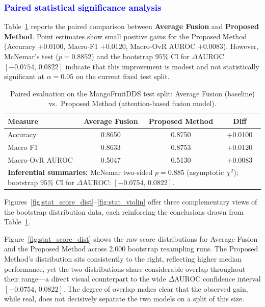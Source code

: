 \documentclass[utf8]{FrontiersinHarvard} %
\begin{document}
\subsubsection{\textcolor{blue}{Paired statistical significance analysis}}
\label{sec:paired_stat_table}
\begingroup\color{blue}
Table~\ref{tab:paired_stats} reports the paired comparison between \textbf{Average Fusion} and \textbf{Proposed Method}. Point estimates show small positive gains for the Proposed Method (Accuracy \(+0.0100\), Macro-F1 \(+0.0120\), Macro-OvR AUROC \(+0.0083\)). However, McNemar's test (\(p=0.8852\)) and the bootstrap \(95\%\) CI for \(\Delta\)AUROC \(\left[-0.0754,\,0.0822\right]\) indicate that this improvement is modest and not statistically significant at \(\alpha=0.05\) on the current fixed test split.

\begin{table}[!ht]
    \centering
    \caption{Paired evaluation on the MangoFruitDDS test split: Average Fusion (baseline) vs.\ Proposed Method (attention-based fusion model).}
    \label{tab:paired_stats}
    \footnotesize
    \begin{tabular}{lccc}
        \toprule
        \textbf{Measure} & \textbf{Average Fusion} & \textbf{Proposed Method} & \textbf{Diff} \\
        \midrule
        Accuracy & 0.8650 & 0.8750 & +0.0100 \\
        Macro F1 & 0.8633 & 0.8753 & +0.0120 \\
        Macro-OvR AUROC & 0.5047 & 0.5130 & +0.0083 \\
        \midrule
        \multicolumn{4}{l}{\textbf{Inferential summaries:} McNemar two-sided $p{=}0.885$ (asymptotic $\chi^{2}$); bootstrap $95$\% CI for $\Delta$AUROC: $[-0.0754,\,0.0822]$.} \\
        \bottomrule
    \end{tabular}
\end{table}
\endgroup

\begingroup\color{blue}
Figures~\ref{fig:stat_score_dist}--\ref{fig:stat_violin} offer three complementary views of the bootstrap distribution data, each reinforcing the conclusions drawn from Table~\ref{tab:paired_stats}.

Figure~\ref{fig:stat_score_dist} shows the raw score distributions for Average Fusion and the Proposed Method across 2{,}000 bootstrap resampling runs. The Proposed Method's distribution sits consistently to the right, reflecting higher median performance, yet the two distributions share considerable overlap throughout their range---a direct visual counterpart to the wide $\Delta$AUROC confidence interval $[-0.0754,\,0.0822]$. The degree of overlap makes clear that the observed gain, while real, does not decisively separate the two models on a split of this size.
\end{document}
